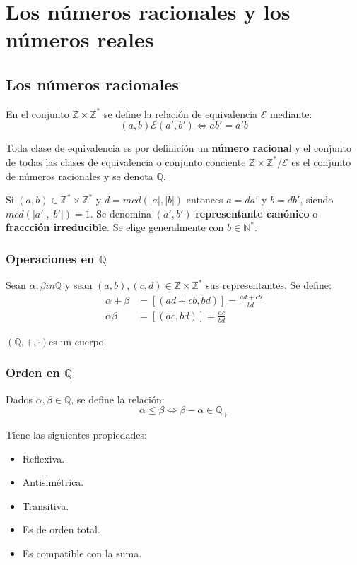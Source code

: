 \chapter{Los números racionales y los números reales}

\section{Los números racionales}

En el conjunto $\mathbb{Z} \times \mathbb{Z}^*$ se define la relación de equivalencia $\mathcal{E}$ mediante:
\[
(a,b) \mathcal{E} (a',b') \Leftrightarrow ab'=a'b
\]

Toda clase de equivalencia es por definición un \textbf{número raciona}l y el conjunto de todas las clases de equivalencia o conjunto conciente $\mathbb{Z} \times \mathbb{Z}^*/\mathcal{E}$ es el conjunto de números racionales y se denota $\mathbb{Q}$.

Si $(a,b) \in \mathbb{Z}^* \times \mathbb{Z}^*$ y $d = mcd(|a|,|b|)$ entonces $a=da'$ y $b=db'$, siendo $mcd(|a'|,|b'|)=1$. Se denomina $(a',b')$ \textbf{representante canónico} o \textbf{fraccción irreducible}. Se elige generalmente con $b \in \mathbb{N}^*$.

\subsection{Operaciones en $\mathbb{Q}$}

Sean $\alpha,\beta in \mathbb{Q}$ y sean $(a,b),(c,d) \in \mathbb{Z} \times \mathbb{Z}^*$ sus representantes. Se define:
\begin{align*}
\alpha + \beta &= [(ad+cb,bd)] = \frac{ad+cb}{bd} \\
\alpha\beta &= [(ac,bd)] = \frac{ac}{bd}
\end{align*}

$(\mathbb{Q},+,\cdot)$es un cuerpo.

\subsection{Orden en $\mathbb{Q}$}

Dados $\alpha,\beta \in \mathbb{Q}$, se define la relación:
\[
\alpha \leq \beta \Leftrightarrow \beta - \alpha \in \mathbb{Q}_+
\]

Tiene las siguientes propiedades:
\begin{itemize}
	\item Reflexiva.
	\item Antisimétrica.
	\item Transitiva.
	\item Es de orden total.
	\item Es compatible con la suma.
\end{itemize}

